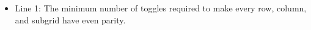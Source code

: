 \begin{itemize}
	\item      Line 1: The minimum number of toggles required to make every row,         column, and subgrid have even parity.    
\end{itemize}

\